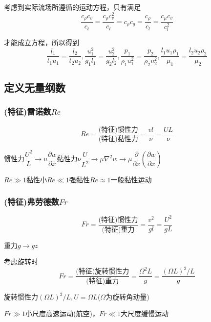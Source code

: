 \documentclass[a4paper,oneside]{ctexbook}
\begin{document}
考虑到实际流场所遵循的运动方程，只有满足
\begin{equation}
    \dfrac{c_\rho{}c_v}{c_t}=\dfrac{c_\rho{}c_v^2}{c_l}=c_\rho{}c_g=\dfrac{c_\rho}{c_l}=\dfrac{c_\mu{}c_v}{c_l^2}
\end{equation}

才能成立方程，所以得到
\begin{equation}
    \dfrac{l_1}{t_1u_1}=\dfrac{l_2}{t_2u_2},\dfrac{u_1^2}{g_1l_1}=\dfrac{u_2^2}{g_2l_2},\dfrac{p_1}{\rho_1u_1^2}=\dfrac{p_2}{\rho_2u_2^2},\dfrac{l_1u_1\rho_1}{\mu_1}=\dfrac{l_2u_2\rho_2}{\mu_2}
\end{equation}

\subsection{定义无量纲数}

\subsubsection{(特征)雷诺数\(Re\)}\begin{equation}Re=\dfrac{\text{(特征)惯性力}}{\text{(特征)黏性力}}=\dfrac{vl}{\nu}=\dfrac{UL}{\nu}\end{equation}

惯性力\(\dfrac{U^2}{L}\to{}u\dfrac{\partial{w}}{\partial{x}}\)黏性力\(\nu\dfrac{U}{L^2}\to\mu\nabla^2w\to\mu\dfrac{\partial}{\partial{x}}(\dfrac{\partial{w}}{\partial{x}})\)

\(Re\gg1\)黏性小\(Re\ll1\)强黏性\(Re\approx1\)一般黏性运动

\subsubsection{(特征)弗劳德数\(Fr\)}\begin{equation}Fr=\dfrac{\text{(特征)惯性力}}{\text{(特征)重力}}=\dfrac{v^2}{gl}=\dfrac{U^2}{gL}\end{equation}

重力\(g\to gz\)

考虑旋转时
\begin{equation}
    Fr=\dfrac{\text{(特征)旋转惯性力}}{\text{(特征)重力}}=\dfrac{\Omega^2L}{g}=\dfrac{(\Omega{L})^2/L}{g}
\end{equation}

旋转惯性力\((\Omega{L})^2/L,U=\Omega{L}\)(\(\Omega\)为旋转角动量)

\(Fr\gg1\)小尺度高速运动(航空)，\(Fr\ll1\)大尺度缓慢运动
\end{document}
